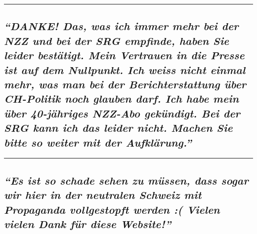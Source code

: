 \begin{center}\rule{0.5\linewidth}{\linethickness}\end{center}

\hypertarget{danke-das-was-ich-immer-mehr-bei-der-nzz-und-bei-der-srg-empfinde-haben-sie-leider-bestuxe4tigt-mein-vertrauen-in-die-presse-ist-auf-dem-nullpunkt-ich-weiss-nicht-einmal-mehr-was-man-bei-der-berichterstattung-uxfcber-ch-politik-noch-glauben-darf-ich-habe-mein-uxfcber-40-juxe4hriges-nzz-abo-gekuxfcndigt-bei-der-srg-kann-ich-das-leider-nicht-machen-sie-bitte-so-weiter-mit-der-aufkluxe4rung}{%
\subsection{\texorpdfstring{\emph{``DANKE! Das, was ich immer mehr bei
der NZZ und bei der SRG empfinde, haben Sie leider bestätigt. Mein
Vertrauen in die Presse ist auf dem Nullpunkt. Ich weiss nicht einmal
mehr, was man bei der Berichterstattung über CH-Politik noch glauben
darf. Ich habe mein über 40-jähriges NZZ-Abo gekündigt. Bei der SRG kann
ich das leider nicht. Machen Sie bitte so weiter mit der
Aufklärung.''}}{``DANKE! Das, was ich immer mehr bei der NZZ und bei der SRG empfinde, haben Sie leider bestätigt. Mein Vertrauen in die Presse ist auf dem Nullpunkt. Ich weiss nicht einmal mehr, was man bei der Berichterstattung über CH-Politik noch glauben darf. Ich habe mein über 40-jähriges NZZ-Abo gekündigt. Bei der SRG kann ich das leider nicht. Machen Sie bitte so weiter mit der Aufklärung.''}}\label{danke-das-was-ich-immer-mehr-bei-der-nzz-und-bei-der-srg-empfinde-haben-sie-leider-bestuxe4tigt-mein-vertrauen-in-die-presse-ist-auf-dem-nullpunkt-ich-weiss-nicht-einmal-mehr-was-man-bei-der-berichterstattung-uxfcber-ch-politik-noch-glauben-darf-ich-habe-mein-uxfcber-40-juxe4hriges-nzz-abo-gekuxfcndigt-bei-der-srg-kann-ich-das-leider-nicht-machen-sie-bitte-so-weiter-mit-der-aufkluxe4rung}}

\begin{center}\rule{0.5\linewidth}{\linethickness}\end{center}

\hypertarget{es-ist-so-schade-sehen-zu-muxfcssen-dass-sogar-wir-hier-in-der-neutralen-schweiz-mit-propaganda-vollgestopft-werden--vielen-vielen-dank-fuxfcr-diese-website}{%
\subsection{\texorpdfstring{\emph{``Es ist so schade sehen zu müssen,
dass sogar wir hier in der neutralen Schweiz mit Propaganda vollgestopft
werden :( Vielen vielen Dank für diese
Website!''}}{``Es ist so schade sehen zu müssen, dass sogar wir hier in der neutralen Schweiz mit Propaganda vollgestopft werden :( Vielen vielen Dank für diese Website!''}}\label{es-ist-so-schade-sehen-zu-muxfcssen-dass-sogar-wir-hier-in-der-neutralen-schweiz-mit-propaganda-vollgestopft-werden--vielen-vielen-dank-fuxfcr-diese-website}}

